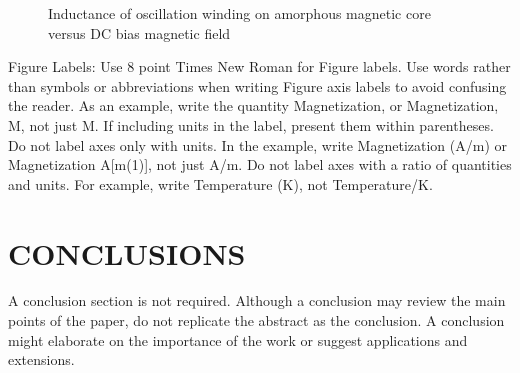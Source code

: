 \documentclass[letterpaper, 10 pt, conference]{ieeeconf}  %
\begin{document}
   \begin{figure}[thpb]
      \centering
      \caption{Inductance of oscillation winding on amorphous
       magnetic core versus DC bias magnetic field}
      \label{figurelabel}
   \end{figure}
   

Figure Labels: Use 8 point Times New Roman for Figure labels. Use words rather than symbols or abbreviations when writing Figure axis labels to avoid confusing the reader. As an example, write the quantity Magnetization, or Magnetization, M, not just M. If including units in the label, present them within parentheses. Do not label axes only with units. In the example, write Magnetization (A/m) or Magnetization {A[m(1)]}, not just A/m. Do not label axes with a ratio of quantities and units. For example, write Temperature (K), not Temperature/K.

\section{CONCLUSIONS}

A conclusion section is not required. Although a conclusion may review the main points of the paper, do not replicate the abstract as the conclusion. A conclusion might elaborate on the importance of the work or suggest applications and extensions. 

\addtolength{\textheight}{-12cm}   %




\end{document}
